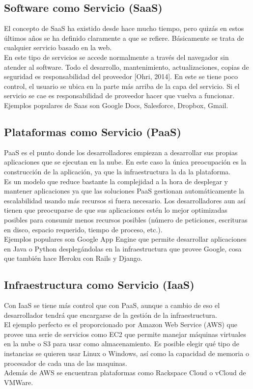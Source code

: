 \documentclass[10pt]{article}   			%
\begin{document}
\subsection{Software como Servicio (SaaS)}

El concepto de SaaS ha existido desde hace mucho tiempo, pero quizás en estos  últimos años se ha definido claramente a que se refiere. Básicamente se trata de cualquier servicio basado en la web.\\
	En este tipo de servicios se accede normalmente a través del navegador sin atender al software. Todo el desarrollo, mantenimiento, actualizaciones, copias de seguridad es responsabilidad del proveedor [Ohri, 2014]. En este se tiene poco control, el usuario se ubica en la parte más arriba de la capa del servicio. Si el servicio se cae es responsabilidad de proveedor hacer que vuelva a funcionar. \\
Ejemplos populares de Saas son Google Docs, Salesforce, Dropbox, Gmail. 
	
\subsection{Plataformas como Servicio (PaaS)}

PaaS es el punto donde los desarrolladores empiezan a desarrollar sus propias aplicaciones que se ejecutan en la nube. En este caso la única preocupación es la construcción de la aplicación, ya que la infraestructura la da la plataforma.\\
Es un modelo que reduce bastante la complejidad a la hora de desplegar y mantener aplicaciones ya que las soluciones PaaS gestionan automáticamente la escalabilidad usando más recursos si fuera necesario. Los desarrolladores aun así tienen que preocuparse de que sus aplicaciones estén lo mejor optimizadas posibles para consumir menos recursos posibles (número de peticiones, escrituras en disco, espacio requerido, tiempo de proceso, etc.).\\
Ejemplos populares son Google App Engine que permite desarrollar aplicaciones en Java o Python desplegándolas en la infraestructura que provee Google, cosa que también hace Heroku con Rails y Django.

\subsection{ Infraestructura como Servicio (IaaS)}

Con IaaS se tiene más control que con PaaS, aunque a cambio de eso el desarrollador tendrá que encargarse de la gestión de la infraestructura. \\
El ejemplo perfecto es el proporcionado por Amazon Web Service (AWS) que provee una serie de servicios como EC2 que permite manejar máquinas virtuales en la nube o S3 para usar como almacenamiento. Es posible elegir qué tipo de instancias se quieren usar Linux o Windows, así como la capacidad de memoria o procesador de cada una de las maquinas.\\
Además de AWS se encuentran plataformas como Rackspace Cloud o vCloud de VMWare.
\end{document}
